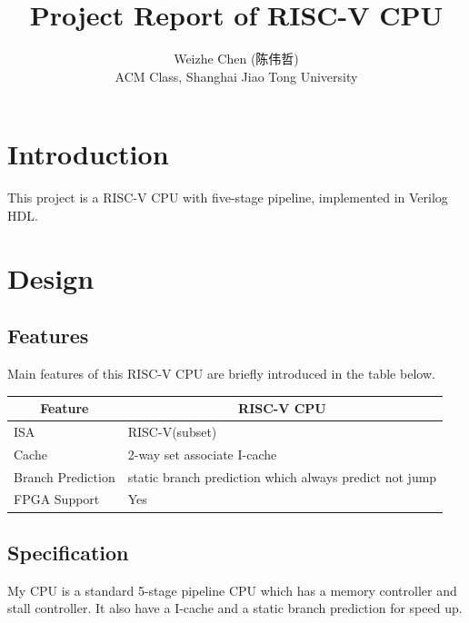 \documentclass[12pt, a4paper]{article}
\title{Project Report of RISC-V CPU}
\author{Weizhe Chen (陈伟哲)\\ACM Class, Shanghai Jiao Tong University}
\date{}
\theoremstyle{margin}
\begin{document}
\maketitle

\section{Introduction}

This project is a RISC-V CPU with five-stage pipeline, implemented in Verilog HDL.

\section{Design}

\subsection{Features}

Main features of this RISC-V CPU are briefly introduced in the table below.

\begin{table}[H]
\centering
\begin{tabular}{@{}ll@{}}
\toprule
\multicolumn{1}{c}{Feature} & \multicolumn{1}{c}{RISC-V CPU}                                                                        \\ \midrule
ISA                         & RISC-V(subset) \\
Cache                       & 2-way set associate I-cache\\
Branch Prediction           & static branch prediction which always predict not jump\\
FPGA Support                & Yes\\
 \bottomrule
\end{tabular}
\end{table}

\subsection{Specification}

My CPU is a standard 5-stage pipeline CPU which has a memory controller and stall controller. It also have a I-cache  and a static branch prediction for speed up.
\end{document}
